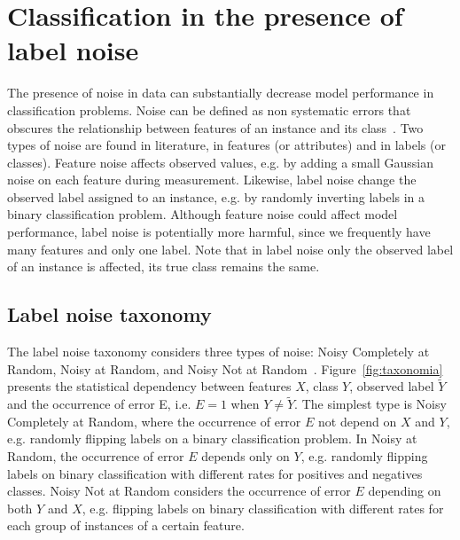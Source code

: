 \section{Classification in the presence of label noise}



The presence of noise in data can substantially decrease model performance in classification problems. Noise can be defined as non systematic errors that obscures the relationship between features of an instance and its class~\citep{Frenay2014,Hickey1996,Quinlan1986}. Two types of noise are found in literature, in features (or attributes) and in labels (or classes). Feature noise affects observed values, e.g. by adding a small Gaussian noise on each feature during measurement. Likewise, label noise change the observed label assigned to an instance, e.g. by randomly inverting labels in a binary classification problem. Although feature noise could affect model performance, label noise is potentially more harmful, since we frequently have many features and only one label. Note that in label noise only the observed label of an instance is affected, its true class remains the same.

\subsection{Label noise taxonomy}

The label noise taxonomy considers three types of noise: Noisy Completely at Random, Noisy at Random, and Noisy Not at Random~\citep{Frenay2014}. Figure~\ref{fig:taxonomia} presents the statistical dependency between features $X$, class $Y$, observed label $\tilde{Y}$ and the occurrence of error E, i.e. $E=1$ when $Y \neq \tilde{Y}$. The simplest type is Noisy Completely at Random, where the occurrence of error $E$ not depend on $X$ and $Y$, e.g. randomly flipping labels on a binary classification problem. In Noisy at Random, the occurrence of error $E$ depends only on $Y$, e.g. randomly flipping labels on binary classification with different rates for positives and negatives classes. Noisy Not at Random considers the occurrence of error $E$ depending on both $Y$ and $X$, e.g. flipping labels on binary classification with different rates for each group of instances of a certain feature.


